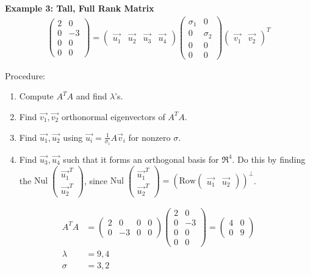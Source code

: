 \noindent
\newline
\textbf{Example 3: Tall, Full Rank Matrix}
\begin{align}
    \begin{pmatrix}
        2 & 0 \\ 0 & -3 \\ 0 & 0 \\ 0 & 0
    \end{pmatrix} = \begin{pmatrix}
        \Vec{u_1} & \Vec{u_2} & \Vec{u_3} & \Vec{u_4}
    \end{pmatrix} \begin{pmatrix}
        \sigma_1 & 0 \\ 0 & \sigma_2 \\ 0 & 0 \\ 0 & 0
    \end{pmatrix} \begin{pmatrix}
        \Vec{v_1} & \Vec{v_2}
    \end{pmatrix}^T
\end{align}

\noindent
Procedure:
\begin{enumerate}
    \item Compute \(A^T A\) and find \(\lambda\)'s.
    \item Find \(\Vec{v_1}, \Vec{v_2}\) orthonormal eigenvectors of \(A^T A\).
    \item Find \(\Vec{u_1}, \Vec{u_2}\) using \(\Vec{u_i} = \frac{1}{\sigma_i} A\Vec{v}_i\) for nonzero \(\sigma\).
    \item Find \(\Vec{u_3}, \Vec{u_4}\) such that it forms an orthogonal basis for \(\Re^4\). Do this by finding the \(\text{Nul} \; \begin{pmatrix}
        \Vec{u_1}^T \\ \Vec{u_2}^T
    \end{pmatrix}\), since \(\text{Nul} \; \begin{pmatrix}
        \Vec{u_1}^T \\ \Vec{u_2}^T
    \end{pmatrix} = \left(\text{Row} \begin{pmatrix}
        \Vec{u_1} & \Vec{u_2}
    \end{pmatrix} \right)^\perp\).
\end{enumerate}

\begin{align}
    A^T A &= \begin{pmatrix}
        2 & 0 & 0 & 0 \\ 0 & -3 & 0 & 0
    \end{pmatrix} \begin{pmatrix}
        2 & 0 \\ 0 & -3 \\ 0 & 0 \\ 0 & 0
    \end{pmatrix} = \begin{pmatrix}
        4 & 0 \\ 0 & 9
    \end{pmatrix} \\
    \lambda &= 9, 4 \\
    \sigma &= 3, 2
\end{align}

